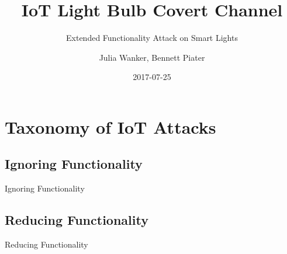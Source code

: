 \documentclass[11pt,t,usepdftitle=false,aspectratio=169]{beamer}
\title[IoT Light Bulb Attack]{IoT Light Bulb Covert Channel}
\subtitle{Extended Functionality Attack on Smart Lights}
\author[Julia Wanker \& Bennett Piater]{Julia Wanker, Bennett Piater}
\date{2017-07-25}
\begin{document}



\section{Taxonomy of IoT Attacks}

\subsection{Ignoring Functionality}
\begin{frame}{Ignoring Functionality}
\end{frame}

\subsection{Reducing Functionality}
\begin{frame}{Reducing Functionality}

\end{frame}
\end{document}
